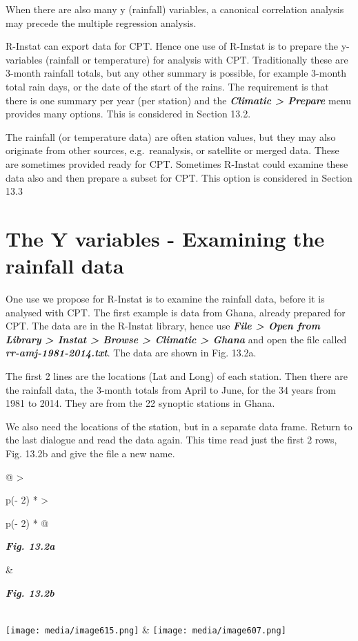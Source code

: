 \documentclass[
  letterpaper,
  DIV=11,
  numbers=noendperiod]{scrreprt}
\begin{document}
When there are also many y (rainfall) variables, a canonical correlation
analysis may precede the multiple regression analysis.

R-Instat can export data for CPT. Hence one use of R-Instat is to
prepare the y-variables (rainfall or temperature) for analysis with CPT.
Traditionally these are 3-month rainfall totals, but any other summary
is possible, for example 3-month total rain days, or the date of the
start of the rains. The requirement is that there is one summary per
year (per station) and the \textbf{\emph{Climatic \textgreater{}
Prepare}} menu provides many options. This is considered in Section
13.2.

The rainfall (or temperature data) are often station values, but they
may also originate from other sources, e.g.~reanalysis, or satellite or
merged data. These are sometimes provided ready for CPT. Sometimes
R-Instat could examine these data also and then prepare a subset for
CPT. This option is considered in Section 13.3

\section{The Y variables - Examining the rainfall
data}\label{the-y-variables---examining-the-rainfall-data}

One use we propose for R-Instat is to examine the rainfall data, before
it is analysed with CPT. The first example is data from Ghana, already
prepared for CPT. The data are in the R-Instat library, hence use
\textbf{\emph{File \textgreater{} Open from Library \textgreater{}
Instat \textgreater{} Browse \textgreater{} Climatic \textgreater{}
Ghana}} and open the file called \textbf{\emph{rr-amj-1981-2014.txt}}.
The data are shown in Fig. 13.2a.

The first 2 lines are the locations (Lat and Long) of each station. Then
there are the rainfall data, the 3-month totals from April to June, for
the 34 years from 1981 to 2014. They are from the 22 synoptic stations
in Ghana.

We also need the locations of the station, but in a separate data frame.
Return to the last dialogue and read the data again. This time read just
the first 2 rows, Fig. 13.2b and give the file a new name.

\begin{longtable}[]{@{}
  >{\raggedright\arraybackslash}p{(\columnwidth - 2\tabcolsep) * }
  >{\raggedright\arraybackslash}p{(\columnwidth - 2\tabcolsep) * }@{}}
\toprule\noalign{}
\begin{minipage}[b]{\linewidth}\raggedright
\textbf{\emph{Fig. 13.2a}}
\end{minipage} & \begin{minipage}[b]{\linewidth}\raggedright
\textbf{\emph{Fig. 13.2b}}
\end{minipage} \\
\midrule\noalign{}
\endhead
\bottomrule\noalign{}
\endlastfoot
\texttt{[image: media/image615.png]} &
\texttt{[image: media/image607.png]} \\
\end{longtable}
\end{document}
